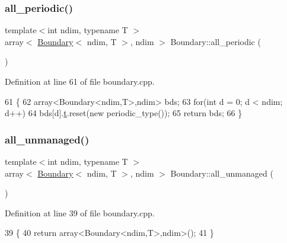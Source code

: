 \subsubsection{\texorpdfstring{all\+\_\+periodic()}{all\_periodic()}}
{\footnotesize\ttfamily template$<$int ndim, typename T $>$ \\
array$<$ \hyperlink{classshark_1_1ndim_1_1_boundary}{Boundary}$<$ ndim, T $>$, ndim $>$ Boundary\+::all\+\_\+periodic (\begin{DoxyParamCaption}{ }\end{DoxyParamCaption})\hspace{0.3cm}{\ttfamily [static]}}



Definition at line 61 of file boundary.\+cpp.


\begin{DoxyCode}
61                                                             \{
62     array<Boundary<ndim,T>,ndim> bds;
63     \textcolor{keywordflow}{for}(\textcolor{keywordtype}{int} d = 0; d < ndim; d++)
64         bds[d].\hyperlink{classshark_1_1ndim_1_1_boundary_a16fdfa33d88480b4127ff36c1f1a2ce7}{t}.reset(\textcolor{keyword}{new} periodic\_type());
65     \textcolor{keywordflow}{return} bds;
66 \}
\end{DoxyCode}
\hypertarget{classshark_1_1ndim_1_1_boundary_ad2764d304ad8f207a882d1aaa93b96e1}{}\label{classshark_1_1ndim_1_1_boundary_ad2764d304ad8f207a882d1aaa93b96e1} 
\subsubsection{\texorpdfstring{all\+\_\+unmanaged()}{all\_unmanaged()}}
{\footnotesize\ttfamily template$<$int ndim, typename T $>$ \\
array$<$ \hyperlink{classshark_1_1ndim_1_1_boundary}{Boundary}$<$ ndim, T $>$, ndim $>$ Boundary\+::all\+\_\+unmanaged (\begin{DoxyParamCaption}{ }\end{DoxyParamCaption})\hspace{0.3cm}{\ttfamily [static]}}



Definition at line 39 of file boundary.\+cpp.


\begin{DoxyCode}
39                                                              \{
40     \textcolor{keywordflow}{return} array<Boundary<ndim,T>,ndim>();
41 \}
\end{DoxyCode}
\hypertarget{classshark_1_1ndim_1_1_boundary_a8e8433bf2c6f1f27f0e4192fd03f70a5}{}\label{classshark_1_1ndim_1_1_boundary_a8e8433bf2c6f1f27f0e4192fd03f70a5} 
